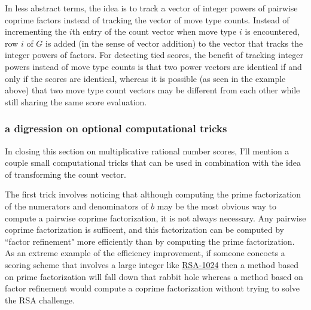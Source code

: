 \documentclass{article}
\begin{document}
In less abstract terms,
the idea is to track a vector of integer powers of pairwise coprime factors
instead of tracking the vector of move type counts.
Instead of incrementing the $i$th entry of
the count vector when move type $i$ is encountered,
row $i$ of $G$ is added (in the sense of vector addition)
to the vector that tracks the integer powers of factors.
For detecting tied scores,
the benefit of tracking integer powers instead of move type counts
is that two power vectors are identical if and only if the scores
are identical, whereas it is possible (as seen in the example above)
that two move type count vectors may be different from each other while
still sharing the same score evaluation.

\subsubsection*{a digression on optional computational tricks}

In closing this section on multiplicative rational number scores,
I'll mention a couple
small computational tricks that can be used in combination
with the idea of transforming the count vector.

The first trick involves noticing that although computing the prime
factorization of the numerators and denominators of $b$ may be the most
obvious way to compute a pairwise coprime factorization,
it is not always necessary.
Any pairwise coprime factorization is sufficent,
and this factorization can be computed by ``factor refinement"
more efficiently than by computing the prime factorization.
As an extreme example of the efficiency improvement,
if someone concocts a scoring scheme that involves a large integer like
\href{https://en.wikipedia.org/wiki/RSA\_numbers#RSA-1024}{RSA-1024}
then a method based on prime factorization will fall down that
rabbit hole whereas a method based on factor refinement would
compute a coprime factorization without trying to solve the RSA challenge.
\end{document}
